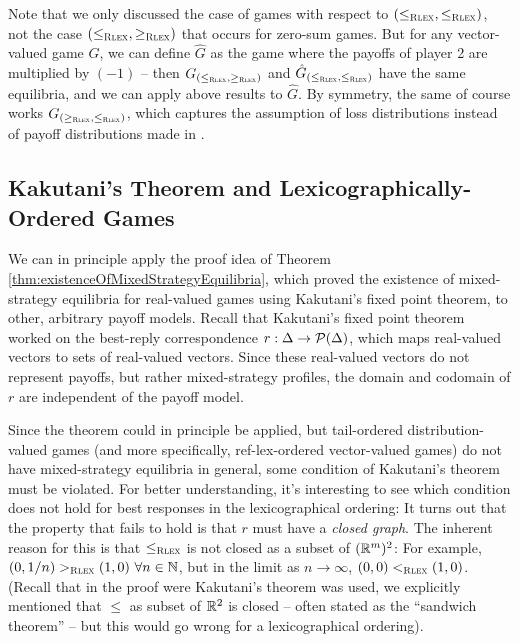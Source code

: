 \documentclass[a4paper]{scrreprt}
\begin{document}
    Note that we only discussed the case of games with respect to ${(\leq_{\textsc{Rlex}},\leq_{\textsc{Rlex}})}$, not the case ${(\leq_{\textsc{Rlex}},\geq_{\textsc{Rlex}})}$ that occurs for zero-sum games.
    But for any vector-valued game $G$, we can define $\hat{G}$ as the game where the payoffs of player 2 are multiplied by $(-1)$ -- then $G_{{(\leq_{\textsc{Rlex}},\geq_{\textsc{Rlex}})}}$ and $\hat{G}_{{(\leq_{\textsc{Rlex}},\leq_{\textsc{Rlex}})}}$ have the same equilibria, and we can apply above results to $\hat{G}$.
    By symmetry, the same of course works $G_{{(\geq_{\textsc{Rlex}},\leq_{\textsc{Rlex}})}}$, which captures the assumption of loss distributions instead of payoff distributions made in \cite{bib:rassGameRiskManagI}.
    
    
    
    \subsection{Kakutani's Theorem and Lexicographically-Ordered Games}
    We can in principle apply the proof idea of Theorem \ref{thm:existenceOfMixedStrategyEquilibria}, which proved the existence of mixed-strategy equilibria for real-valued games using Kakutani's fixed point theorem, to other, arbitrary payoff models. Recall that Kakutani's fixed point theorem worked on the best-reply correspondence $r: \Delta \to \operatorname{\mathcal{P}}(\Delta)$, which maps real-valued vectors to sets of real-valued vectors. Since these real-valued vectors do not represent payoffs, but rather mixed-strategy profiles, the domain and codomain of $r$ are independent of the payoff model.
    
    Since the theorem could in principle be applied, but tail-ordered distribution-valued games (and more specifically, ref-lex-ordered vector-valued games) do not have mixed-strategy equilibria in general, some condition of Kakutani's theorem must be violated. For better understanding, it's interesting to see which condition does not hold for best responses in the lexicographical ordering:
    It turns out that the property that fails to hold is that $r$ must have a \emph{closed graph}.
    The inherent reason for this is that $\leq_{\textsc{Rlex}}$ is not closed as a subset of $(\mathbb{R}^m)^2$:
    For example, $(0, 1/n) >_{\textsc{Rlex}} (1, 0) ~ \forall n \in \mathbb{N}$, but in the limit as $n \to \infty$, $(0, 0) <_{\textsc{Rlex}} (1, 0)$.
    (Recall that in the proof were Kakutani's theorem was used, we explicitly mentioned that $\leq$ as subset of $\mathbb{R}^2$ is closed -- often stated as the “sandwich theorem” -- but this would go wrong for a lexicographical ordering).
    
\end{document}
